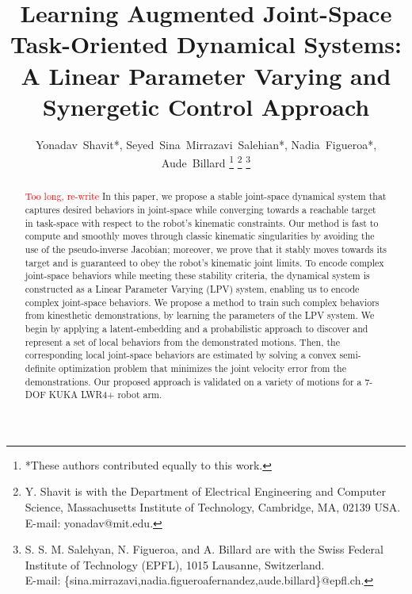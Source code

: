 \documentclass[letterpaper, 10 pt, conference,fleqn]{ieeeconf}
\begin{document}
%
\title{Learning Augmented Joint-Space Task-Oriented Dynamical Systems: \\ A
Linear Parameter Varying and Synergetic Control Approach}


%
%
\author{Yonadav~Shavit*,  Seyed~Sina~Mirrazavi~Salehian*, Nadia~Figueroa*, Aude~Billard
\thanks{*These authors contributed equally to this work.}
\thanks{Y. Shavit is with the Department
of Electrical Engineering and Computer Science, Massachusetts Institute of Technology, Cambridge,
MA, 02139 USA. E-mail: yonadav@mit.edu.}%
\thanks{S. S. M. Salehyan, N. Figueroa, and A. Billard are with the Swiss Federal Institute of Technology (EPFL), 1015 Lausanne, Switzerland. \\E-mail: \{sina.mirrazavi,nadia.figueroafernandez,aude.billard\}@epfl.ch.}
}%


\maketitle
\thispagestyle{empty}
\pagestyle{empty}



\begin{abstract}
\textcolor{red}{Too long, re-write}
In this paper, we propose a stable joint-space dynamical system that captures desired behaviors in joint-space while converging towards a reachable target in task-space with respect to the robot's kinematic constraints. Our method is fast to compute and smoothly moves through classic kinematic singularities by avoiding the use of the pseudo-inverse Jacobian; moreover, we prove that it stably moves towards its target and is guaranteed to obey the robot's kinematic joint limits. To encode complex joint-space behaviors while meeting these stability criteria, the dynamical system is constructed as a Linear Parameter Varying (LPV) system, enabling us to encode complex joint-space behaviors. We propose a method to train such complex behaviors from kinesthetic demonstrations, by learning the parameters of the LPV system. We begin by applying a latent-embedding and a probabilistic approach to discover and represent a set of local behaviors from the demonstrated motions. Then, the corresponding local joint-space behaviors are estimated by solving a convex semi-definite optimization problem that minimizes the joint velocity error from the demonstrations. Our proposed approach is validated on a variety of motions for a 7-DOF KUKA LWR4+ robot arm.\end{abstract}
\end{document}
